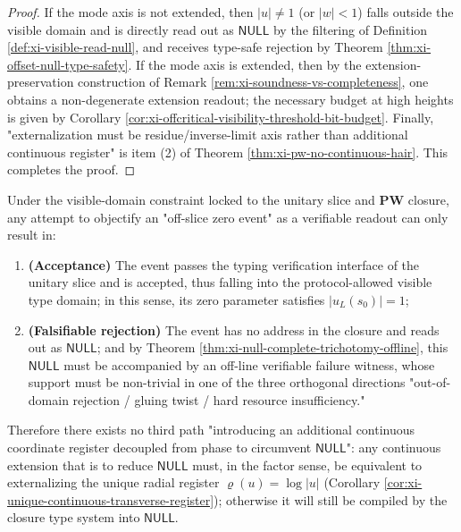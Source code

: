 \begin{proof}
If the mode axis is not extended, then \(|u|\neq 1\) (or \(|w|<1\)) falls outside the visible domain and is directly read out as \(\mathsf{NULL}\) by the filtering of Definition \ref{def:xi-visible-read-null}, and receives type-safe rejection by Theorem \ref{thm:xi-offset-null-type-safety}.
If the mode axis is extended, then by the extension-preservation construction of Remark \ref{rem:xi-soundness-vs-completeness}, one obtains a non-degenerate extension readout; the necessary budget at high heights is given by Corollary \ref{cor:xi-offcritical-visibility-threshold-bit-budget}.
Finally, "externalization must be residue/inverse-limit axis rather than additional continuous register" is item (2) of Theorem \ref{thm:xi-pw-no-continuous-hair}. This completes the proof.
\end{proof}

\begin{corollary}\label{cor:xi-offcritical-dichotomy-acceptable-or-null}
Under the visible-domain constraint locked to the unitary slice and \(\mathbf{PW}\) closure, any attempt to objectify an "off-slice zero event" as a verifiable readout can only result in:
\begin{enumerate}
  \item \textbf{(Acceptance)} The event passes the typing verification interface of the unitary slice and is accepted, thus falling into the protocol-allowed visible type domain; in this sense, its zero parameter satisfies \(|u_L(s_0)|=1\);
  \item \textbf{(Falsifiable rejection)} The event has no address in the closure and reads out as \(\mathsf{NULL}\); and by Theorem \ref{thm:xi-null-complete-trichotomy-offline}, this \(\mathsf{NULL}\) must be accompanied by an off-line verifiable failure witness, whose support must be non-trivial in one of the three orthogonal directions "out-of-domain rejection / gluing twist / hard resource insufficiency."
\end{enumerate}
Therefore there exists no third path "introducing an additional continuous coordinate register decoupled from phase to circumvent \(\mathsf{NULL}\)": any continuous extension that is to reduce \(\mathsf{NULL}\) must, in the factor sense, be equivalent to externalizing the unique radial register \(\varrho(u)=\log|u|\) (Corollary \ref{cor:xi-unique-continuous-transverse-register}); otherwise it will still be compiled by the closure type system into \(\mathsf{NULL}\).
\end{corollary}

